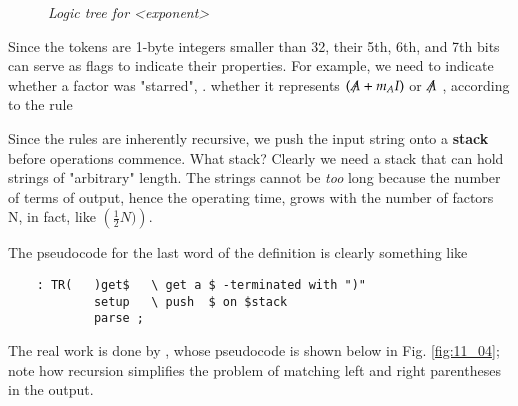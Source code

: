 \begin{figure}[H]
\centering
{}
\caption{\textit{Logic tree for <exponent>}}\label{fig:11_01}
\end{figure}

Since the tokens are 1-byte integers smaller than 32, their 5th, 6th, and 7th bits can serve as flags to indicate their properties. For example, we need to indicate whether a factor was "starred", \ie. whether it represents $(\tr{A} + m_{A}I)$ or $\tr{A}$ , according to the rule

Since the rules are inherently recursive, we push the input string onto a \textbf{stack} before operations commence. What stack? Clearly we need a stack that can hold strings of "arbitrary" length. The strings cannot be \textit{too} long because the number of terms of output, hence the operating time, grows with the number of factors N, in fact, like $\left(\frac{1}{2}N)\right)$\bc{!}.

The pseudocode for the last word of the definition is clearly something like

\begin{lstlisting}
    : TR(   )get$   \ get a $ -terminated with ")"
            setup   \ push  $ on $stack
            parse ;
\end{lstlisting}

The real work is done by , whose pseudocode is shown below in Fig. \ref{fig:11_04}; note how recursion simplifies the problem of matching left and right parentheses in the output.

